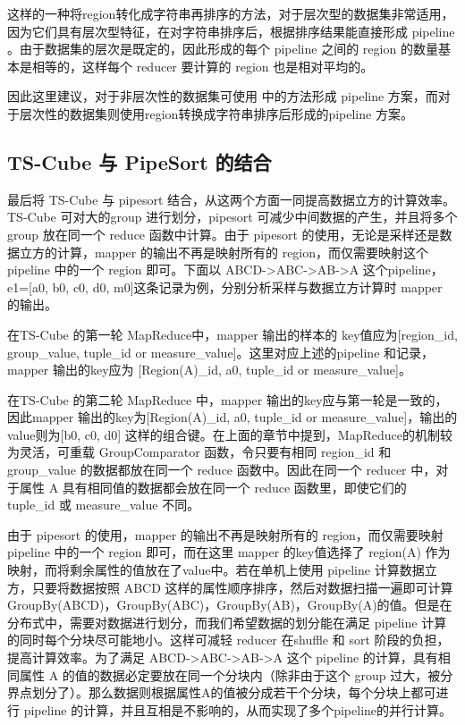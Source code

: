 这样的一种将region转化成字符串再排序的方法，对于层次型的数据集非常适用，因为它们具有层次型特征，在对字符串排序后，根据排序结果能直接形成 pipeline 。由于数据集的层次是既定的，因此形成的每个 pipeline 之间的 region 的数量基本是相等的，这样每个 reducer 要计算的 region 也是相对平均的。

因此这里建议，对于非层次性的数据集可使用 \cite{wang2013scalable} 中的方法形成 pipeline 方案，而对于层次性的数据集则使用region转换成字符串排序后形成的pipeline 方案。

\subsection{TS-Cube 与 PipeSort 的结合}

最后将 TS-Cube 与 pipesort 结合，从这两个方面一同提高数据立方的计算效率。TS-Cube 可对大的group 进行划分，pipesort 可减少中间数据的产生，并且将多个 group 放在同一个 reduce 函数中计算。由于 pipesort 的使用，无论是采样还是数据立方的计算，mapper 的输出不再是映射所有的 region，而仅需要映射这个pipeline 中的一个 region 即可。下面以 ABCD-\textgreater ABC-\textgreater AB-\textgreater A 这个pipeline，e1=[a0, b0, c0, d0, m0]这条记录为例，分别分析采样与数据立方计算时 mapper 的输出。

在TS-Cube 的第一轮 MapReduce中，mapper 输出的样本的 key值应为[region\_id, group\_value, tuple\_id or measure\_value]。这里对应上述的pipeline 和记录，mapper 输出的key应为 [Region(A)\_id, a0, tuple\_id or measure\_value]。

在TS-Cube 的第二轮 MapReduce 中，mapper 输出的key应与第一轮是一致的，因此mapper 输出的key为[Region(A)\_id, a0, tuple\_id or measure\_value]，输出的value则为[b0, c0, d0] 这样的组合键。在上面的章节中提到，MapReduce的机制较为灵活，可重载 GroupComparator 函数，令只要有相同 region\_id 和 group\_value 的数据都放在同一个 reduce 函数中。因此在同一个 reducer 中，对于属性 A 具有相同值的数据都会放在同一个 reduce 函数里，即使它们的 tuple\_id 或 measure\_value 不同。

由于 pipesort 的使用，mapper 的输出不再是映射所有的 region，而仅需要映射 pipeline 中的一个 region 即可，而在这里 mapper 的key值选择了 region(A) 作为映射，而将剩余属性的值放在了value中。若在单机上使用 pipeline 计算数据立方，只要将数据按照 ABCD 这样的属性顺序排序，然后对数据扫描一遍即可计算 GroupBy(ABCD)，GroupBy(ABC)，GroupBy(AB)，GroupBy(A)的值。但是在分布式中，需要对数据进行划分，而我们希望数据的划分能在满足 pipeline 计算的同时每个分块尽可能地小。这样可减轻 reducer 在shuffle 和 sort 阶段的负担，提高计算效率。为了满足 ABCD-\textgreater ABC-\textgreater AB-\textgreater A 这个 pipeline 的计算，具有相同属性 A 的值的数据必定要放在同一个分块内（除非由于这个 group 过大，被分界点划分了）。那么数据则根据属性A的值被分成若干个分块，每个分块上都可进行 pipeline 的计算，并且互相是不影响的，从而实现了多个pipeline的并行计算。


